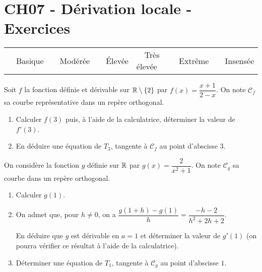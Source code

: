 \documentclass[a4paper,11pt]{article}
\author{Pierquet}
\title{\nomfichier}
\begin{document}
\pagestyle{fancy}

\part{CH07 - Dérivation locale - Exercices}

\medskip

\begin{caide}
{\setlength\arrayrulewidth{1.5pt} 
\begin{tabularx}{\linewidth}{Y|Y|Y|Y|Y|Y}
	~~\textsf{Basique} & ~~\textsf{Modérée} & ~~\textsf{Élevée} & ~~\textsf{Très élevée} & ~~\textsf{Extrême} & ~~\textsf{Insensée} \\
\end{tabularx}}
\end{caide}


\medskip

Soit $f$ la fonction définie et dérivable sur $\R\setminus\left\lbrace2\right\rbrace$ par $f(x)=\dfrac{x+1}{2-x}$. On note $\mathscr{C}_f$ sa courbe représentative dans un repère orthogonal.

\begin{enumerate}
	\item Calculer $f(3)$ puis, à l'aide de la calculatrice, déterminer la valeur de $f'(3)$.
	\item En déduire une équation de $T_3$, tangente à $\mathscr{C}_f$ au point d'abscisse $3$.
\end{enumerate} 

\medskip


\medskip

On considère la fonction $g$ définie sur $\R$ par $g(x)=\dfrac{2}{x^2+1}$. On note $\mathscr{C}_g$ sa courbe dans un repère orthogonal.
%
\begin{enumerate}
	\item Calculer $g(1)$.
	\item On admet que, pour $h \neq 0$, on a $\dfrac{g(1+h)-g(1)}{h}=\dfrac{-h-2}{h^2+2h+2}$.
	
	En déduire que $g$ est dérivable en $a=1$ et déterminer la valeur de $g'(1)$ (on pourra vérifier ce résultat à l'aide de la calculatrice).
	\item Déterminer une équation de $T_1$, tangente à $\mathscr{C}_g$ au point d'abscisse $1$.
\end{enumerate}
\end{document}
